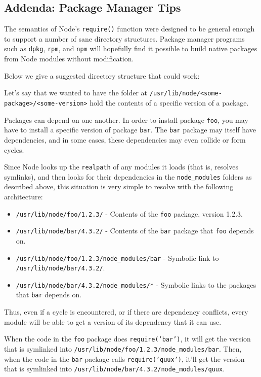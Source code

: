 \subsection{Addenda: Package Manager
Tips}\label{addenda-package-manager-tips}

The semantics of Node's \texttt{require()} function were designed to be
general enough to support a number of sane directory structures. Package
manager programs such as \texttt{dpkg}, \texttt{rpm}, and \texttt{npm}
will hopefully find it possible to build native packages from Node
modules without modification.

Below we give a suggested directory structure that could work:

Let's say that we wanted to have the folder at
\texttt{/usr/lib/node/\textless{}some-package\textgreater{}/\textless{}some-version\textgreater{}}
hold the contents of a specific version of a package.

Packages can depend on one another. In order to install package
\texttt{foo}, you may have to install a specific version of package
\texttt{bar}. The \texttt{bar} package may itself have dependencies, and
in some cases, these dependencies may even collide or form cycles.

Since Node looks up the \texttt{realpath} of any modules it loads (that
is, resolves symlinks), and then looks for their dependencies in the
\texttt{node\_modules} folders as described above, this situation is
very simple to resolve with the following architecture:

\begin{itemize}
\itemsep1pt\parskip0pt
\item
  \texttt{/usr/lib/node/foo/1.2.3/} - Contents of the \texttt{foo}
  package, version 1.2.3.
\item
  \texttt{/usr/lib/node/bar/4.3.2/} - Contents of the \texttt{bar}
  package that \texttt{foo} depends on.
\item
  \texttt{/usr/lib/node/foo/1.2.3/node\_modules/bar} - Symbolic link to
  \texttt{/usr/lib/node/bar/4.3.2/}.
\item
  \texttt{/usr/lib/node/bar/4.3.2/node\_modules/*} - Symbolic links to
  the packages that \texttt{bar} depends on.
\end{itemize}

Thus, even if a cycle is encountered, or if there are dependency
conflicts, every module will be able to get a version of its dependency
that it can use.

When the code in the \texttt{foo} package does \texttt{require('bar')},
it will get the version that is symlinked into
\texttt{/usr/lib/node/foo/1.2.3/node\_modules/bar}. Then, when the code
in the \texttt{bar} package calls \texttt{require('quux')}, it'll get
the version that is symlinked into
\texttt{/usr/lib/node/bar/4.3.2/node\_modules/quux}.

